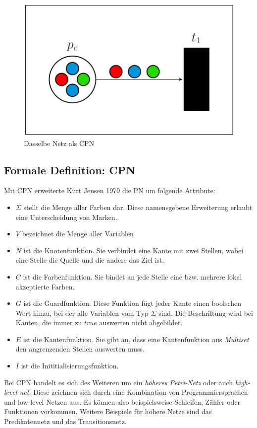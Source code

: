 \documentclass[11pt,onecolumn,a4paper,DIV=calc]{scrartcl}
\begin{document}
\begin{figure}[h]
\center
\includegraphics[scale=0.4]{netz2.PNG}
\caption{Dasselbe Netz als CPN}
\end{figure}

\subsection{Formale Definition: CPN}
Mit CPN erweiterte Kurt Jensen \cite{CPN1} 1979 die PN um folgende Attribute:
\begin{itemize}
\item $\Sigma$ stellt die Menge aller Farben dar. Diese namensgebene Erweiterung erlaubt eine Unterscheidung von Marken.
\item $V$ bezeichnet die Menge aller Variablen
\item $N$ ist die Knotenfunktion. Sie verbindet eine Kante mit zwei Stellen, wobei eine Stelle die Quelle und die andere das Ziel ist.
\item $C$ ist die Farbenfunktion. Sie bindet an jede Stelle eine bzw. mehrere lokal akzeptierte Farben.
\item $G$ ist die Guardfunktion. Diese Funktion fügt jeder Kante einen boolschen Wert hinzu, bei der alle Variablen vom Typ $\Sigma$ sind. Die Beschriftung wird bei Kanten, die immer zu $true$ auswerten nicht abgebildet.
\item $E$ ist die Kantenfunktion. Sie gibt an, dass eine Kantenfunktion aus \textit{Multiset} den angrenzenden Stellen auswerten muss. 
\item $I$ ist die Inititialisierungsfunktion.
\end{itemize}
Bei CPN handelt es sich des Weiteren um ein \textit{höheres Petri-Netz} oder auch \textit{high-level net}. Diese zeichnen sich durch eine Kombination von Programmiersprachen und low-level Netzen aus. Es können also beispielsweise Schleifen, Zähler oder Funktionen vorkommen. Weitere Beispiele für höhere Netze sind das Predikatennetz und das Transitionsnetz.
\end{document}
